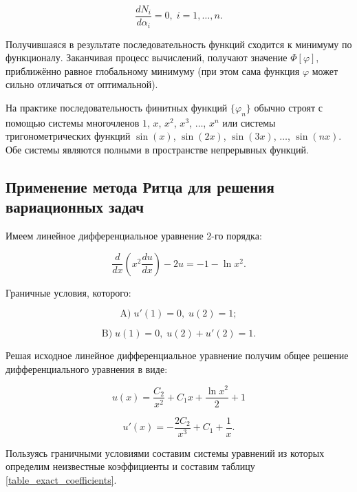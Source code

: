 \documentclass{article}
\begin{document}
\begin{displaymath}
	\frac{d N_{i}}{d\alpha_{i}} = 0, \; i = 1, \ldots, n.
\end{displaymath}

Получившаяся в результате последовательность функций сходится к минимуму по функционалу. Заканчивая процесс вычислений, получают значение $\Phi[\varphi]$, приближённо равное глобальному минимуму (при этом сама функция $\varphi$ может сильно отличаться от оптимальной).

На практике последовательность финитных функций ${\lbrace \varphi_{n} \rbrace}$ обычно строят с помощью системы многочленов $1$, $x$, $x^2$, $x^3$, $\ldots$, $x^n$ или системы тригонометрических функций $\sin (x)$, $\sin (2x)$, $\sin (3x)$, $\ldots$, $\sin (nx)$. Обе системы являются полными в пространстве непрерывных функций.

\subsection{Применение метода Ритца для решения вариационных задач}

Имеем линейное дифференциальное уравнение 2-го порядка:

\begin{displaymath}
	\frac{d}{dx} \left( x^2 \frac{d u}{dx} \right) - 2u = -1 - \ln{x^2}.
\end{displaymath}

\noindent Граничные условия, которого:

\begin{displaymath}
	\text{A)} \; u'(1) = 0, \; u(2) = 1;
\end{displaymath}

\begin{displaymath}
	\text{B)} \; u(1) = 0, \; u(2) + u'(2) = 1.
\end{displaymath}

\noindent Решая исходное линейное дифференциальное уравнение получим общее решение дифференциального уравнения в виде:

\begin{displaymath}
	u(x) = \frac{C_{2}}{x^2} + C_{1}x + \frac{\ln{x^2}}{2} + 1
\end{displaymath}

\begin{displaymath}
	u'(x) = - \frac{2C_{2}}{x^3} + C_{1} + \frac{1}{x}.
\end{displaymath}

Пользуясь граничными условиями составим системы уравнений из которых определим неизвестные коэффициенты и составим таблицу \ref{table_exact_coefficients}. 
\end{document}
